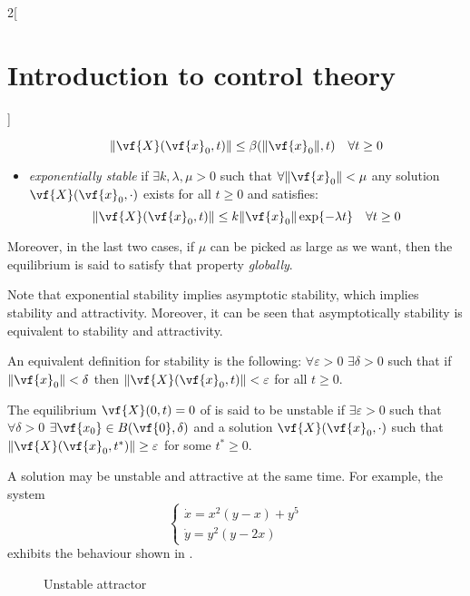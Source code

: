 \documentclass[../../../main_math.tex]{subfiles}
\begin{document}
\begin{multicols}{2}[\section{Introduction to control theory}]
\begin{definition}
\begin{itemize}
$$              \norm{\vf{X}(\vf{x}_0, t)}\leq \beta(\norm{\vf{x}_0}, t)\quad\forall t\geq 0
            $$
      \item \emph{exponentially stable} if $\exists k,\lambda,\mu>0$ such that $\forall\norm{\vf{x}_0}<\mu$ any solution $\vf{X}(\vf{x}_0, \cdot)$ exists for all $t\geq 0$ and satisfies:
            $$
              \norm{\vf{X}(\vf{x}_0, t)}\leq k\norm{\vf{x}_0} \exp{-\lambda t}\quad\forall t\geq 0
            $$
    \end{itemize}
    Moreover, in the last two cases, if $\mu$ can be picked as large as we want, then the equilibrium is said to satisfy that property \emph{globally}.
  \end{definition}
  \begin{remark}
    Note that exponential stability implies asymptotic stability, which implies stability and attractivity. Moreover, it can be seen that asymptotically stability is equivalent to stability and attractivity.
  \end{remark}
  \begin{remark}
    An equivalent definition for stability is the following: $\forall \varepsilon>0$ $\exists \delta>0$ such that if $\norm{\vf{x}_0}<\delta$ then $\norm{\vf{X}(\vf{x}_0, t)}<\varepsilon$ for all $t\geq 0$.
  \end{remark}
  \begin{definition}
    The equilibrium $\vf{X}(0, t)=0$ of  is said to be unstable if $\exists \varepsilon>0$ such that $\forall \delta>0$ $\exists \vf{x_0}\in B(\vf{0},\delta)$ and a solution $\vf{X}(\vf{x}_0, \cdot)$ such that $\norm{\vf{X}(\vf{x}_0, t^*)}\geq \varepsilon$ for some $t^*\geq 0$.
  \end{definition}
  \begin{remark}
    A solution may be unstable and attractive at the same time. For example, the system
    $$
      \begin{cases}
        \dot{x} = x^2(y-x) + y^5 \\
        \dot{y} = y^2(y-2x)
      \end{cases}
    $$
    exhibits the behaviour shown in .
    \begin{figure}[H]
      \centering
      
      \caption{Unstable attractor}
      \label{ICT:unstable_attractor}
    \end{figure}
  \end{remark}
  \begin{definition}

\end{definition}
\end{multicols}
\end{document}
